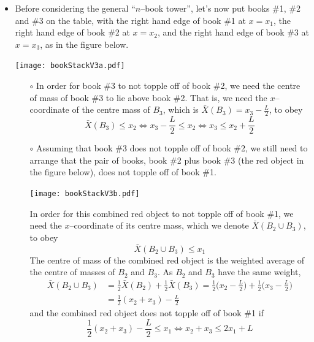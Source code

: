 \begin{itemize}
\item
Before considering the general ``$n$--book tower'', let's now put
books \#1, \#2 and \#3
on the table, with the right hand edge of book \#1 at $x=x_1$,
the right hand edge of book \#2 at  $x=x_2$, and the right
hand edge of book \#3 at $x=x_3$, as in the figure below.
\begin{efig}
\begin{center}
     \texttt{[image: bookStackV3a.pdf]}
\end{center}
\end{efig}
\begin{itemize}\itemsep1pt \parskip0pt  \itemindent-10pt
\item[$\circ$]
In order for book \#3 to not topple off of book \#2, we need the
centre of mass of book \#3 to lie above book \#2. That is, we need
the $x$--coordinate of the centre mass of $B_3$, which is
$\bar X(B_3)=x_3-\frac{L}{2}$, to obey
\begin{equation*}
\bar X(B_3) \le x_2
\iff
x_3-\frac{L}{2} \le x_2
\iff
x_3\le x_2+\frac{L}{2}
\end{equation*}
\item[$\circ$]
Assuming that book \#3 does not topple off of book \#2, we still
need to arrange that the pair of books, book \#2 plus book \#3 (the
red object in the figure below), does not topple off of book \#1.
\begin{efig}
\begin{center}
     \texttt{[image: bookStackV3b.pdf]}
\end{center}
\end{efig}
In order for this combined red object to not topple off of book \#1,
we need the $x$--coordinate of its centre mass, which we denote
$\bar X(B_2\cup B_3)$, to obey
\begin{equation*}
\bar X(B_2\cup B_3) \le x_1
\end{equation*}
The centre of mass of the combined red object is the weighted
average  of the centre of masses of $B_2$ and $B_3$.
As $B_2$ and $B_3$ have the same weight,
\begin{align*}
\bar X(B_2\cup B_3) &= \frac{1}{2}\bar X(B_2) +\frac{1}{2}\bar X(B_3)
    = \frac{1}{2}\Big(x_2-\frac{L}{2}\Big)
      +\frac{1}{2}\Big(x_3-\frac{L}{2}\Big)
\\
&= \frac{1}{2}(x_2+x_3) -\frac{L}{2}
\end{align*}
and the combined red object does not topple off of book \#1 if
\begin{equation*}
\frac{1}{2}(x_2+x_3) -\frac{L}{2} \le x_1
\iff
x_2+x_3\le 2x_1+L
\end{equation*}


\end{itemize}
\end{itemize}
